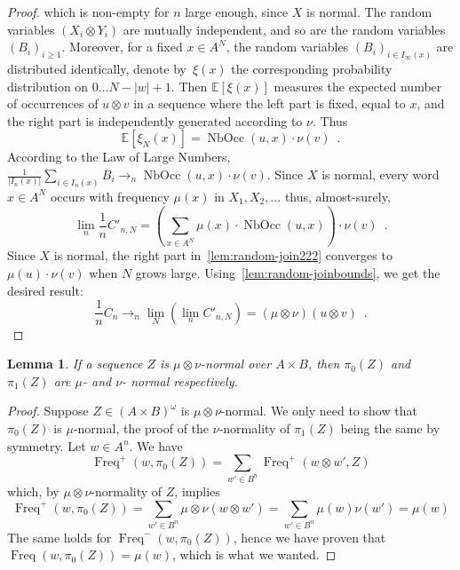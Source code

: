 \documentclass[11pt]{article}
\newtheorem{lemma}{Lemma}
\DeclareMathOperator{\nbocc}{NbOcc}
\DeclareMathOperator{\freq}{Freq}
\begin{document}
\begin{proof}
which is non-empty for $n$ large enough, since $X$ is normal.
The random variables $(X_i\otimes Y_i)$ are mutually independent,
and so are the random variables $(B_i)_{i\geq 1}$.
Moreover, for a fixed $x \in A^{N}$,
the random variables $(B_i)_{i\in I_\infty(x)}$ are distributed identically,
denote by~$\xi(x)$ the corresponding probability distribution on $0\ldots N-|w|+1$.
Then $\mathbb{E}\left[ \xi(x) \right]$ measures the expected number of
occurrences of $u \otimes v$ in a sequence where the left part is fixed, equal to $x$,
and the right part is independently generated according to $\nu$. Thus
\[
\mathbb{E}\left[ \xi_N(x) \right]  = \nbocc(u, x) \cdot \nu(v) \enspace.
\]
According to the Law of Large Numbers, 
$\frac{1}{| I_n(x)  |}\sum_{i\in I_n(x) } B_i\to_n  \nbocc(u, x) \cdot \nu(v)$.
Since $X$ is normal, every word $x \in A^N$ occurs with frequency $\mu(x)$ in $X_1,X_2,\ldots$
thus, almost-surely,
\begin{equation}
\label{lem:random-join222}
\lim_n \frac{1}{n} C'_{n,N} = \left(\sum_{x \in A^N} \mu(x)\cdot  \nbocc(u, x)\right)\cdot\nu(v)\enspace.
\end{equation}
Since $X$ is normal, the right part in~\eqref{lem:random-join222} converges to  $\mu(u)\cdot \nu(v)$
when $N$ grows large.
Using~\eqref{lem:random-joinbounds}, we get
the desired result: 
\[
\frac{1}{n}C_n \to_n \lim_N \left(\lim_n C'_{n,N}\right)  = (\mu \otimes \nu)(u \otimes v)\enspace.
\]
\end{proof}

\begin{lemma}\label{lem:projection}
If a sequence $Z$ is $\mu \otimes \nu$-normal over $A \times B$, then $\pi_0(Z)$ and $\pi_1(Z)$ are $\mu$- and $\nu$- normal respectively. 
\end{lemma}

\begin{proof}
Suppose $Z \in (A \times B)^\omega$ is $\mu \otimes \nu$-normal. We only need to show that $\pi_0(Z)$ is $\mu$-normal, the proof of the $\nu$-normality of $\pi_1(Z)$ being the same by symmetry. Let $w \in A^n$. We have
\[
\freq^+(w,\pi_0(Z))  =  \sum_{w' \in B^n} \freq^+(w \otimes w',Z)
\]
which, by $\mu \otimes \nu$-normality of $Z$, implies 
\[
\freq^+(w,\pi_0(Z))  =  \sum_{w' \in B^n} \mu \otimes \nu(w \otimes w')=  \sum_{w' \in B^n} \mu(w)\nu(w') = \mu(w)
\]
The same holds for $\freq^-(w,\pi_0(Z))$, hence we have proven that $\freq(w,\pi_0(Z))=\mu(w)$, which is what we wanted. 

\end{proof}
\end{document}
